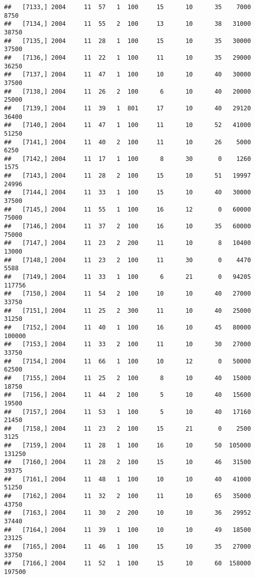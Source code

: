 \documentclass{article}\usepackage[]{graphicx}\usepackage[]{color}
\makeatletter
\newenvironment{kframe}{%
 \def\at@end@of@kframe{}%
 \ifinner\ifhmode%
  \def\at@end@of@kframe{\end{minipage}}%
  \begin{minipage}{\columnwidth}%
 \fi\fi%
 \def\FrameCommand##1{\hskip\@totalleftmargin \hskip-\fboxsep
 \colorbox{shadecolor}{##1}\hskip-\fboxsep
     \hskip-\linewidth \hskip-\@totalleftmargin \hskip\columnwidth}%
 \MakeFramed {\advance\hsize-\width
   \@totalleftmargin\z@ \linewidth\hsize
   \@setminipage}}%
 {\par\unskip\endMakeFramed%
 \at@end@of@kframe}
\newenvironment{knitrout}{}{} %
\makeatother
\begin{document}
\begin{knitrout}
\begin{kframe}
\begin{verbatim}
##   [7133,] 2004     11  57   1  100     15      10      35    7000    8750
##   [7134,] 2004     11  55   2  100     13      10      38   31000   38750
##   [7135,] 2004     11  28   1  100     15      10      35   30000   37500
##   [7136,] 2004     11  22   1  100     11      10      35   29000   36250
##   [7137,] 2004     11  47   1  100     10      10      40   30000   37500
##   [7138,] 2004     11  26   2  100      6      10      40   20000   25000
##   [7139,] 2004     11  39   1  801     17      10      40   29120   36400
##   [7140,] 2004     11  47   1  100     11      10      52   41000   51250
##   [7141,] 2004     11  40   2  100     11      10      26    5000    6250
##   [7142,] 2004     11  17   1  100      8      30       0    1260    1575
##   [7143,] 2004     11  28   2  100     15      10      51   19997   24996
##   [7144,] 2004     11  33   1  100     15      10      40   30000   37500
##   [7145,] 2004     11  55   1  100     16      12       0   60000   75000
##   [7146,] 2004     11  37   2  100     16      10      35   60000   75000
##   [7147,] 2004     11  23   2  200     11      10       8   10400   13000
##   [7148,] 2004     11  23   2  100     11      30       0    4470    5588
##   [7149,] 2004     11  33   1  100      6      21       0   94205  117756
##   [7150,] 2004     11  54   2  100     10      10      40   27000   33750
##   [7151,] 2004     11  25   2  300     11      10      40   25000   31250
##   [7152,] 2004     11  40   1  100     16      10      45   80000  100000
##   [7153,] 2004     11  33   2  100     11      10      30   27000   33750
##   [7154,] 2004     11  66   1  100     10      12       0   50000   62500
##   [7155,] 2004     11  25   2  100      8      10      40   15000   18750
##   [7156,] 2004     11  44   2  100      5      10      40   15600   19500
##   [7157,] 2004     11  53   1  100      5      10      40   17160   21450
##   [7158,] 2004     11  23   2  100     15      21       0    2500    3125
##   [7159,] 2004     11  28   1  100     16      10      50  105000  131250
##   [7160,] 2004     11  28   2  100     15      10      46   31500   39375
##   [7161,] 2004     11  48   1  100     10      10      40   41000   51250
##   [7162,] 2004     11  32   2  100     11      10      65   35000   43750
##   [7163,] 2004     11  30   2  200     10      10      36   29952   37440
##   [7164,] 2004     11  39   1  100     10      10      49   18500   23125
##   [7165,] 2004     11  46   1  100     15      10      35   27000   33750
##   [7166,] 2004     11  52   1  100     15      10      60  158000  197500

\end{verbatim}
\end{kframe}
\end{knitrout}
\end{document}
